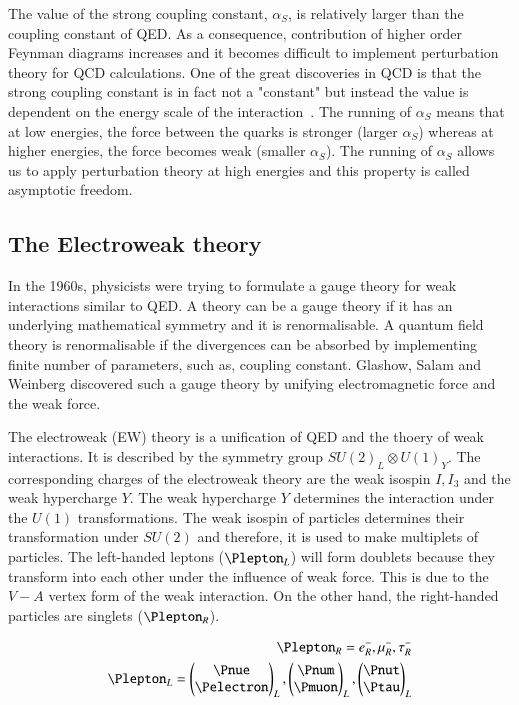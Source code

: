 The value of the strong coupling constant, $\alpha_S$, is relatively larger than the coupling 
constant of QED. As a consequence, contribution of higher order Feynman diagrams
increases and it becomes difficult to implement perturbation theory for QCD calculations. One of the
great discoveries in QCD is that the strong coupling constant is in fact not a "constant" but instead the
value is dependent on the energy scale of the interaction~\cite{Deur:2016tte}. The running of $\alpha_S$ means that at low
energies, the force between the quarks is stronger (larger $\alpha_S$) whereas at higher energies, the 
force becomes weak (smaller $\alpha_S$). The running of $\alpha_S$ allows us to apply perturbation theory
at high energies and this property is called asymptotic freedom. 

\subsection{The Electroweak theory}
\label{sec:ewtheory}
In the 1960s, physicists were trying to formulate a gauge theory for weak interactions
similar to QED. A theory can be a gauge theory if it has an underlying mathematical symmetry
and it is renormalisable. A quantum field theory is renormalisable if the divergences can be absorbed
by implementing finite number of parameters, such as, coupling constant. Glashow,
Salam and Weinberg discovered such a gauge theory by unifying electromagnetic force and 
the weak force.

The electroweak (EW) theory is a unification of QED and the thoery of weak interactions. 
It is described by the symmetry group $SU(2)_L \otimes U(1)_Y$. The corresponding
charges of the electroweak theory are the weak isospin $I,I_3$ and the weak hypercharge $Y$.
The weak hypercharge $Y$ determines the interaction under the $U(1)$ transformations.
The weak isospin of particles determines their transformation under $SU(2)$ and therefore, it is
used to make multiplets of particles. The left-handed leptons ($\Plepton_L$) will form doublets
because they transform into each other under the influence of weak force. 
This is due to the $V-A$ vertex form of the weak interaction. On the other hand, the right-handed 
particles are singlets ($\Plepton_R$). 

\begin{align}
    \Plepton_R = e^{-}_R, \mu^{-}_R, \tau^{-}_R \\
    \Plepton_L = \begin{pmatrix} \Pnue \\ \Pelectron \end{pmatrix}_L , \begin{pmatrix} \Pnum \\ \Pmuon \end{pmatrix}_L , \begin{pmatrix} \Pnut \\ \Ptau \end{pmatrix}_L 
\end{align}


